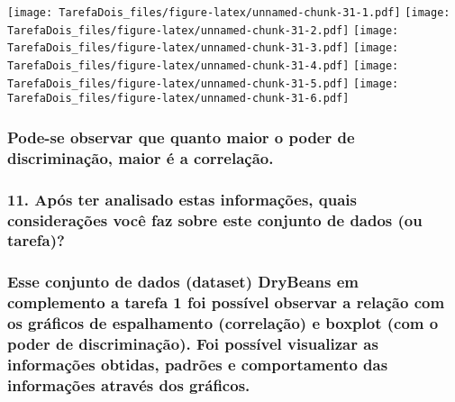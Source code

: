 \documentclass[
]{article}
\begin{document}
\texttt{[image: TarefaDois\_files/figure-latex/unnamed-chunk-31-1.pdf]}
\texttt{[image: TarefaDois\_files/figure-latex/unnamed-chunk-31-2.pdf]}
\texttt{[image: TarefaDois\_files/figure-latex/unnamed-chunk-31-3.pdf]}
\texttt{[image: TarefaDois\_files/figure-latex/unnamed-chunk-31-4.pdf]}
\texttt{[image: TarefaDois\_files/figure-latex/unnamed-chunk-31-5.pdf]}
\texttt{[image: TarefaDois\_files/figure-latex/unnamed-chunk-31-6.pdf]}

\hypertarget{pode-se-observar-que-quanto-maior-o-poder-de-discriminauxe7uxe3o-maior-uxe9-a-correlauxe7uxe3o.-1}{%
\subsubsection{Pode-se observar que quanto maior o poder de
discriminação, maior é a
correlação.}\label{pode-se-observar-que-quanto-maior-o-poder-de-discriminauxe7uxe3o-maior-uxe9-a-correlauxe7uxe3o.-1}}

\hypertarget{apuxf3s-ter-analisado-estas-informauxe7uxf5es-quais-considerauxe7uxf5es-vocuxea-faz-sobre-este-conjunto-de-dados-ou-tarefa}{%
\subsubsection{11. Após ter analisado estas informações, quais
considerações você faz sobre este conjunto de dados (ou
tarefa)?}\label{apuxf3s-ter-analisado-estas-informauxe7uxf5es-quais-considerauxe7uxf5es-vocuxea-faz-sobre-este-conjunto-de-dados-ou-tarefa}}

\hypertarget{esse-conjunto-de-dados-dataset-drybeans-em-complemento-a-tarefa-1-foi-possuxedvel-observar-a-relauxe7uxe3o-com-os-gruxe1ficos-de-espalhamento-correlauxe7uxe3o-e-boxplot-com-o-poder-de-discriminauxe7uxe3o.-foi-possuxedvel-visualizar-as-informauxe7uxf5es-obtidas-padruxf5es-e-comportamento-das-informauxe7uxf5es-atravuxe9s-dos-gruxe1ficos.}{%
\subsubsection{Esse conjunto de dados (dataset) DryBeans em complemento
a tarefa 1 foi possível observar a relação com os gráficos de
espalhamento (correlação) e boxplot (com o poder de discriminação). Foi
possível visualizar as informações obtidas, padrões e comportamento das
informações através dos
gráficos.}\label{esse-conjunto-de-dados-dataset-drybeans-em-complemento-a-tarefa-1-foi-possuxedvel-observar-a-relauxe7uxe3o-com-os-gruxe1ficos-de-espalhamento-correlauxe7uxe3o-e-boxplot-com-o-poder-de-discriminauxe7uxe3o.-foi-possuxedvel-visualizar-as-informauxe7uxf5es-obtidas-padruxf5es-e-comportamento-das-informauxe7uxf5es-atravuxe9s-dos-gruxe1ficos.}}
\end{document}
